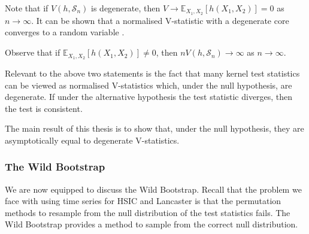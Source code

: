 \documentclass[12pt]{article}
\numberwithin{claim}{section}
\numberwithin{lemma}{section}
\numberwithin{theorem}{section}
\begin{document}
Note that if $V(h,\mathcal{S}_n)$ is degenerate, then $V \longrightarrow \mathbb{E}_{X_1,X_2}[h(X_1,X_2)] = 0$ as $n \longrightarrow \infty$. It can be shown that a normalised V-statistic with a degenerate core converges to a random variable \cite{serfling2009approximation}.

Observe that if $\mathbb{E}_{X_1,X_2}[h(X_1,X_2)] \neq 0$, then $nV(h,\mathcal{S}_n) \longrightarrow \infty$ as $n\longrightarrow \infty$.

Relevant to the above two statements is the fact that many kernel test statistics can be viewed as normalised V-statistics which, under the null hypothesis, are degenerate. If under the alternative hypothesis the test statistic diverges, then the test is consistent.

The main result of this thesis is to show that, under the null hypothesis, they are asymptotically equal to degenerate V-statistics.


%
%
%
%
%
%

\subsubsection{The Wild Bootstrap}

We are now equipped to discuss the Wild Bootstrap. Recall that the problem we face with using time series for HSIC and Lancaster is that the permutation methods to resample from the null distribution of the test statistics fails. The Wild Bootstrap provides a method to sample from the correct null distribution.
\end{document}
